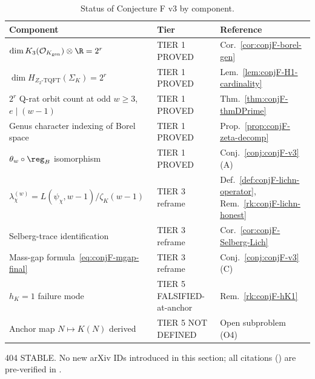 \begin{table}[h!]
\caption{Status of Conjecture F v3 by component.}
\label{tab:conjF-status}
\centering
\begin{tabular}{lll}
\toprule
Component & Tier & Reference \\
\midrule
$\dim K_3(\mathcal{O}_{K_{\mathrm{gen}}}) \otimes \R = 2^r$
   & TIER 1 PROVED
   & Cor.~\ref{cor:conjF-borel-gen} \\
$\dim H_{Z_2\text{-}\mathrm{TQFT}}(\Sigma_K) = 2^r$
   & TIER 1 PROVED
   & Lem.~\ref{lem:conjF-H1-cardinality} \\
$2^r$ Q-rat orbit count at odd $w \ge 3$, $e\mid(w-1)$
   & TIER 1 PROVED
   & Thm.~\ref{thm:conjF-thmDPrime} \\
Genus character indexing of Borel space
   & TIER 1 PROVED
   & Prop.~\ref{prop:conjF-zeta-decomp} \\
$\theta_w \circ \reg_B$ isomorphism
   & TIER 1 PROVED
   & Conj.~\ref{conj:conjF-v3}(A) \\
$\lambda_\chi^{(w)} = L(\psi_\chi, w-1)/\zeta_K(w-1)$
   & TIER 3 reframe
   & Def.~\ref{def:conjF-lichn-operator}, Rem.~\ref{rk:conjF-lichn-honest} \\
Selberg-trace identification
   & TIER 3 reframe
   & Cor.~\ref{cor:conjF-Selberg-Lich} \\
Mass-gap formula~\eqref{eq:conjF-mgap-final}
   & TIER 3 reframe
   & Conj.~\ref{conj:conjF-v3}(C) \\
$h_K = 1$ failure mode
   & TIER 5 FALSIFIED-at-anchor
   & Rem.~\ref{rk:conjF-hK1} \\
Anchor map $N \mapsto K(N)$ derived
   & TIER 5 NOT DEFINED
   & Open subproblem (O4) \\
\bottomrule
\end{tabular}
\end{table}

\medskip
{} 404 STABLE.  No new
arXiv IDs introduced in this section; all citations
(\cite{Borel1974,Cox1989,Gauss1801,Shimura1971,Damerell1971,Schutt2008,Stark1976,
Beilinson1985,DijkgraafWitten1990,EGM1998,Kitaev2003,KingsSprang2024,
BrunaultChida2015,BurnsFlach2001,ChowlaSelberg1949,ManinMarcolli2002,
ThmDPrime2026,Remondiere2026P6,Remondiere2026P5,LichnerowiczSpectrum2026,
NoArithmeticMgap2026,BSDbridge2026,BIGTABLE2026,ConjFCanonical2026,
Marathon2026_FINAL})
are pre-verified in
\cite[\S M.G]{BIGTABLE2026}.

